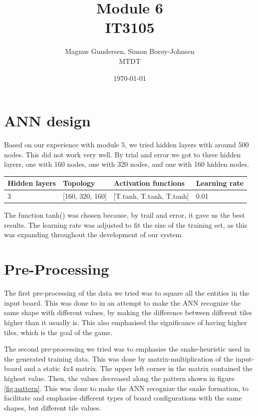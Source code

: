 \documentclass{article}
\begin{document}
\title{\textbf{Module 6} \\ IT3105}
\author{Magnus Gundersen, Simon Borøy-Johnsen \\ MTDT}
\date{\today}
\maketitle


\section{ANN design}
Based on our experience with module 5, we tried hidden layers with around 500 nodes. This did not work very well. By trial and error we got to three hidden layers, one with 160 nodes, one with 320 nodes, and one with 160 hidden nodes. 

\begin{tabular}{|l|l|l|l|}
    \hline
    Hidden layers     & Topology            & Activation functions          & Learning rate  \\\hline
    3                 & [160, 320, 160]     &   [T.tanh, T.tanh, T.tanh]    & 0.01             \\\hline              
\end{tabular}

The function tanh() was chosen because, by trail and error, it gave us the best results. The learning rate was adjusted to fit the size of the training set, as this was expanding throughout the development of our system.

\section{Pre-Processing}

The first pre-processing of the data we tried was to square all the entities in the input board. This was done to in an attempt to make the ANN recognize the same shape with different values, by making the difference between different tiles higher than it usually is. This also emphasised the significance of having higher tiles, which is the goal of the game.

The second pre-processing we tried was to emphasise the snake-heuristic used in the generated training data. This was done by matrix-multiplication of the input-board and a static 4x4 matrix. The upper left corner in the matrix contained the highest value. Then, the values decreased along the pattern shown in figure \ref{fig:pattern}. This was done to make the ANN recognize the snake formation, to facilitate and emphasise different types of board configurations with the same shapes, but different tile values.
\end{document}

